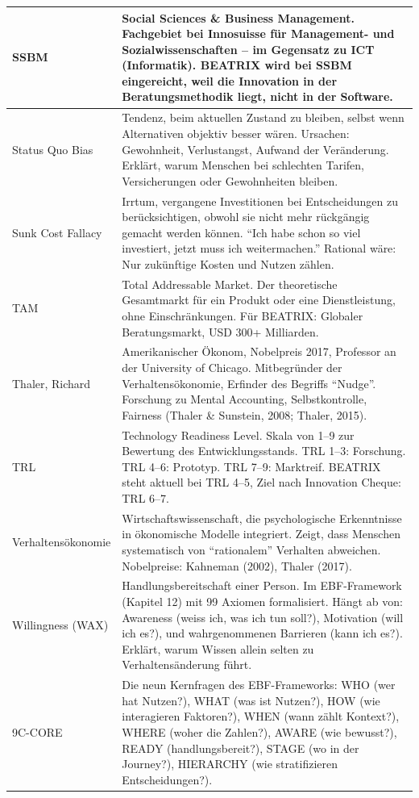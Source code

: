 \documentclass[11pt,a4paper]{article}
\begin{document}
\begin{longtable}{@{}L{4cm}L{10cm}@{}}
\midrule
SSBM & Social Sciences \& Business Management. Fachgebiet bei Innosuisse für Management- und Sozialwissenschaften -- im Gegensatz zu ICT (Informatik). BEATRIX wird bei SSBM eingereicht, weil die Innovation in der Beratungsmethodik liegt, nicht in der Software. \\
\midrule
Status Quo Bias & Tendenz, beim aktuellen Zustand zu bleiben, selbst wenn Alternativen objektiv besser wären. Ursachen: Gewohnheit, Verlustangst, Aufwand der Veränderung. Erklärt, warum Menschen bei schlechten Tarifen, Versicherungen oder Gewohnheiten bleiben. \\
\midrule
Sunk Cost Fallacy & Irrtum, vergangene Investitionen bei Entscheidungen zu berücksichtigen, obwohl sie nicht mehr rückgängig gemacht werden können. ``Ich habe schon so viel investiert, jetzt muss ich weitermachen.'' Rational wäre: Nur zukünftige Kosten und Nutzen zählen. \\
\midrule
TAM & Total Addressable Market. Der theoretische Gesamtmarkt für ein Produkt oder eine Dienstleistung, ohne Einschränkungen. Für BEATRIX: Globaler Beratungsmarkt, USD 300+ Milliarden. \\
\midrule
Thaler, Richard & Amerikanischer Ökonom, Nobelpreis 2017, Professor an der University of Chicago. Mitbegründer der Verhaltensökonomie, Erfinder des Begriffs ``Nudge''. Forschung zu Mental Accounting, Selbstkontrolle, Fairness (Thaler \& Sunstein, 2008; Thaler, 2015). \\
\midrule
TRL & Technology Readiness Level. Skala von 1--9 zur Bewertung des Entwicklungsstands. TRL 1--3: Forschung. TRL 4--6: Prototyp. TRL 7--9: Marktreif. BEATRIX steht aktuell bei TRL 4--5, Ziel nach Innovation Cheque: TRL 6--7. \\
\midrule
Verhaltensökonomie & Wirtschaftswissenschaft, die psychologische Erkenntnisse in ökonomische Modelle integriert. Zeigt, dass Menschen systematisch von ``rationalem'' Verhalten abweichen. Nobelpreise: Kahneman (2002), Thaler (2017). \\
\midrule
Willingness (WAX) & Handlungsbereitschaft einer Person. Im EBF-Framework (Kapitel 12) mit 99 Axiomen formalisiert. Hängt ab von: Awareness (weiss ich, was ich tun soll?), Motivation (will ich es?), und wahrgenommenen Barrieren (kann ich es?). Erklärt, warum Wissen allein selten zu Verhaltensänderung führt. \\
\midrule
9C-CORE & Die neun Kernfragen des EBF-Frameworks: WHO (wer hat Nutzen?), WHAT (was ist Nutzen?), HOW (wie interagieren Faktoren?), WHEN (wann zählt Kontext?), WHERE (woher die Zahlen?), AWARE (wie bewusst?), READY (handlungsbereit?), STAGE (wo in der Journey?), HIERARCHY (wie stratifizieren Entscheidungen?). \\
\bottomrule
\end{longtable}
\end{document}

